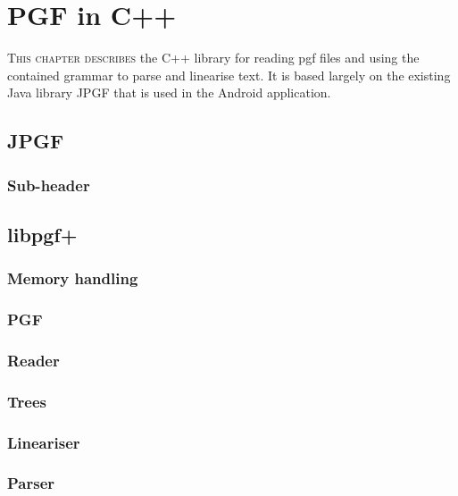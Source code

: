 \chapter{PGF in C++}
\lettrine[lines=4, loversize=-0.1, lraise=0.1]{T}{his chapter describes} the C++ library for reading pgf files and using the contained grammar to parse and linearise text. It is based largely on the existing Java library JPGF that is used in the Android application.
\section{JPGF}
\subsection{Sub-header}
\section{libpgf+}
\subsection{Memory handling}
\subsection{PGF}
\subsection{Reader}
\subsection{Trees}
\subsection{Lineariser}
\subsection{Parser}
